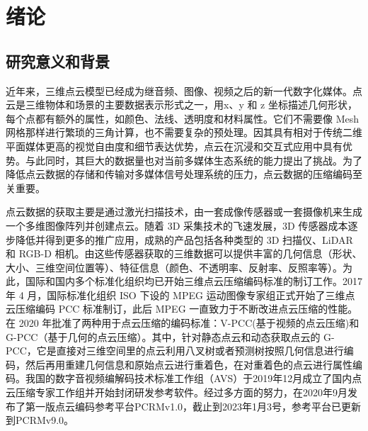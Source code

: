 \documentclass[bachelor,print,msfonts]{xduthesis}
\begin{document}
\frontmatter





\makecover

\tableofcontents

\mainmatter
\chapter{绪论}

\section{研究意义和背景}
近年来，三维点云模型已经成为继音频、图像、视频之后的新一代数字化媒体。点云是三维物体和场景的主要数据表示形式之一，用x、y 和 z 坐标描述几何形状，每个点都有额外的属性，如颜色、法线、透明度和材料属性。它们不需要像 Mesh 网格那样进行繁琐的三角计算，也不需要复杂的预处理\cite{ref1}。因其具有相对于传统二维平面媒体更高的视觉自由度和细节表达优势，点云在沉浸和交互式应用中具有优势。与此同时，其巨大的数据量也对当前多媒体生态系统的能力提出了挑战。为了降低点云数据的存储和传输对多媒体信号处理系统的压力，点云数据的压缩编码至关重要\cite{ref4}。

点云数据的获取主要是通过激光扫描技术，由一套成像传感器或一套摄像机来生成一个多维图像阵列并创建点云。随着 3D 采集技术的飞速发展，3D 传感器成本逐步降低并得到更多的推广应用，成熟的产品包括各种类型的 3D 扫描仪、LiDAR 和 RGB-D 相机。由这些传感器获取的三维数据可以提供丰富的几何信息（形状、大小、三维空间位置等）、特征信息（颜色、不透明率、反射率、反照率等）。为此，国际和国内多个标准化组织\cite{ref2}均已开始三维点云压缩编码标准的制订工作。2017 年 4 月，国际标准化组织 ISO 下设的 MPEG 运动图像专家组正式开始了三维点云压缩编码 PCC 标准制订，此后 MPEG 一直致力于不断改进点云压缩的性能。在 2020 年批准了两种用于点云压缩的编码标准：V-PCC(基于视频的点云压缩)和 G-PCC（基于几何的点云压缩）。其中，针对静态点云和动态获取点云的 G-PCC，它是直接对三维空间里的点云利用八叉树或者预测树按照几何信息进行编码，然后再用重建几何信息和原始点云进行重着色，在对重着色的点云进行属性编码。我国的数字音视频编解码技术标准工作组（AVS）于2019年12月成立了国内点云压缩专家工作组并开始封闭研发参考软件。经过多方面的努力，在2020年9月发布了第一版点云编码参考平台PCRMv1.0，截止到2023年1月3号，参考平台已更新到PCRMv9.0。
\end{document}
